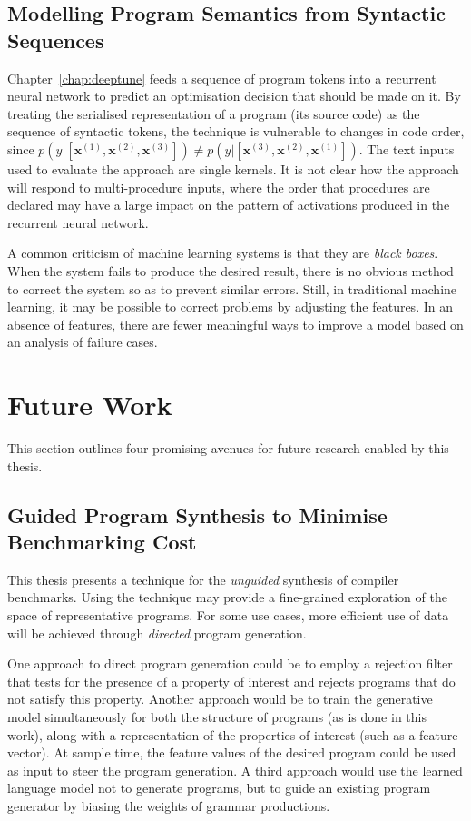 \subsection{Modelling Program Semantics from Syntactic Sequences}

Chapter~\ref{chap:deeptune} feeds a sequence of program tokens into a recurrent neural network to predict an optimisation decision that should be made on it. By treating the serialised representation of a program (its source code) as the sequence of syntactic tokens, the technique is vulnerable to changes in code order, since $p(y|[\bm{x}^{(1)}, \bm{x}^{(2)}, \bm{x}^{(3)}]) \ne p(y|[\bm{x}^{(3)}, \bm{x}^{(2)}, \bm{x}^{(1)}])$. The text inputs used to evaluate the approach are single kernels. It is not clear how the approach will respond to multi-procedure inputs, where the order that procedures are declared may have a large impact on the pattern of activations produced in the recurrent neural network.

A common criticism of machine learning systems is that they are \emph{black boxes}. When the system fails to produce the desired result, there is no obvious method to correct the system so as to prevent similar errors. Still, in traditional machine learning, it may be possible to correct problems by adjusting the features. In an absence of features, there are fewer meaningful ways to improve a model based on an analysis of failure cases.


\section{Future Work}
\label{sec:conclusions-future-work}

This section outlines four promising avenues for future research enabled by this thesis.

\subsection{Guided Program Synthesis to Minimise Benchmarking Cost}

This thesis presents a technique for the \emph{unguided} synthesis of compiler benchmarks. Using the technique may provide a fine-grained exploration of the space of representative programs. For some use cases, more efficient use of data will be achieved through \emph{directed} program generation.

One approach to direct program generation could be to employ a rejection filter that tests for the presence of a property of interest and rejects programs that do not satisfy this property. Another approach would be to train the generative model simultaneously for both the structure of programs (as is done in this work), along with a representation of the properties of interest (such as a feature vector). At sample time, the feature values of the desired program could be used as input to steer the program generation. A third approach would use the learned language model not to generate programs, but to guide an existing program generator by biasing the weights of grammar productions.

